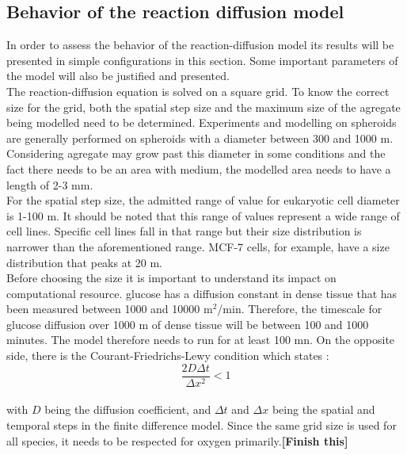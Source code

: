 \documentclass[11pt,a4paper]{article}
\begin{document}
\subsection{Behavior of the reaction diffusion model}
In order to assess the behavior of the reaction-diffusion model its results will be presented in simple configurations in this section. Some important parameters of the model will also be justified and presented.\\

The reaction-diffusion equation is solved on a square grid. To know the correct size for the grid, both the spatial step size and the maximum size of the agregate being modelled need to be determined. Experiments and modelling on spheroids are generally performed on spheroids with a diameter between 300 and 1000 \textmu m.\cite{Freyer1986}\cite{MullerKlieser1986}\cite{Mao2018} Considering agregate may grow past this diameter in some conditions and the fact there needs to be an area with medium, the modelled area needs to have a length of 2-3 mm.\\

For the spatial step size, the admitted range of value for eukaryotic cell diameter is 1-100 \textmu m.\cite{Cooper2006} It should be noted that this  range of values represent a wide range of cell lines. Specific cell lines fall in  that range but their size distribution is narrower than the aforementioned range. MCF-7 cells, for example,  have a size distribution that peaks at 20 \textmu m.\cite{Moon2013}\\

Before choosing the size it is important to understand its impact on computational resource. glucose has a diffusion constant in dense tissue that has been measured between 1000 and 10000 \textmu m$^2$/min.\cite{Casciari1992}\cite{Mao2018} Therefore, the timescale for glucose diffusion over 1000 \textmu m of dense tissue will be between 100 and 1000 minutes. The model therefore needs to run for at least 100 mn. On the opposite side, there is the Courant-Friedrichs-Lewy condition which states :\\

\[ \frac{2 D \Delta t}{\Delta x^2} < 1 \] \\

with $D$ being the diffusion coefficient, and $\Delta t$ and $\Delta x$ being the spatial and temporal steps in the finite difference model. Since the same grid size is used for all species, it needs to be respected for oxygen primarily.\textbf{[Finish this]}\\
\end{document}
